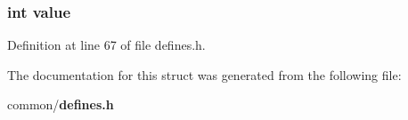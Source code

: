 \subsubsection[{value}]{\setlength{\rightskip}{0pt plus 5cm}int value}\label{struct_reading__t_ac4f474c82e82cbb89ca7c36dd52be0ed}


Definition at line 67 of file defines.\-h.



The documentation for this struct was generated from the following file\-:\begin{DoxyCompactItemize}
\item 
common/{\bf defines.\-h}\end{DoxyCompactItemize}
